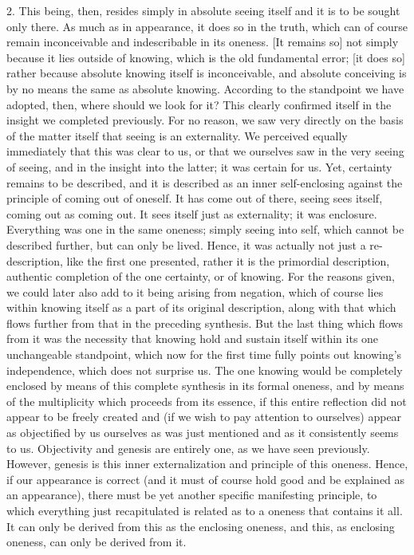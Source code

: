 2. This being, then, resides simply
in absolute seeing itself
and it is to be sought only there.
As much as in appearance,
it does so in the truth,
which can of course remain
inconceivable and indescribable
in its oneness.
[It remains so] not simply because
it lies outside of knowing,
which is the old fundamental error;
[it does so] rather because
absolute knowing itself is inconceivable,
and absolute conceiving is by no means
the same as absolute knowing.
According to the standpoint we have adopted, then,
where should we look for it?
This clearly confirmed itself
in the insight we completed previously.
For no reason, we saw very directly
on the basis of the matter itself
that seeing is an externality.
We perceived equally immediately
that this was clear to us,
or that we ourselves saw
in the very seeing of seeing,
and in the insight into the latter;
it was certain for us.
Yet, certainty remains to be described,
and it is described as an inner self-enclosing
against the principle of coming out of oneself.
It has come out of there, seeing sees itself,
coming out as coming out.
It sees itself just as externality;
it was enclosure.
Everything was one in the same oneness;
simply seeing into self,
which cannot be described further,
but can only be lived.
Hence, it was actually not just a re-description,
like the first one presented,
rather it is the primordial description,
authentic completion of the one certainty, or of knowing.
For the reasons given, we could later also
add to it being arising from negation,
which of course lies within knowing itself
as a part of its original description,
along with that which flows further
from that in the preceding synthesis.
But the last thing which flows from it was
the necessity that knowing hold and sustain itself
within its one unchangeable standpoint,
which now for the first time fully
points out knowing’s independence,
which does not surprise us.
The one knowing would be completely enclosed
by means of this complete
synthesis in its formal oneness,
and by means of the multiplicity
which proceeds from its essence,
if this entire reflection did not appear
to be freely created and
(if we wish to pay attention to ourselves)
appear as objectified by us ourselves as was
just mentioned and as it consistently seems to us.
Objectivity and genesis are entirely one,
as we have seen previously.
However, genesis is this inner
externalization and principle of this oneness.
Hence, if our appearance is correct
(and it must of course hold good
and be explained as an appearance),
there must be yet another
specific manifesting principle,
to which everything just recapitulated is related
as to a oneness that contains it all.
It can only be derived from this
as the enclosing oneness,
and this, as enclosing oneness,
can only be derived from it.

